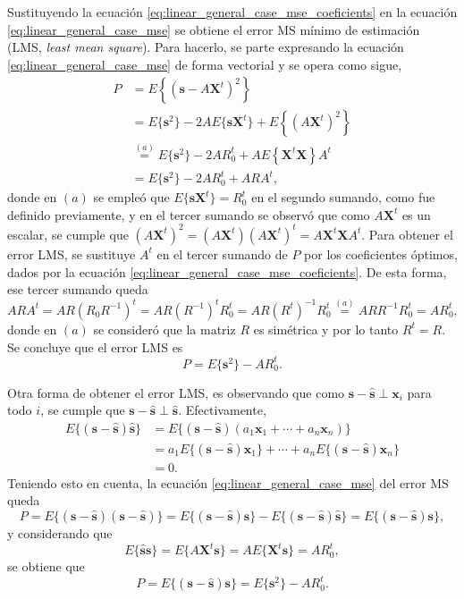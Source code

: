 \documentclass[a4paper]{report}
\newcommand{\X}{\mathbf{X}}
\newcommand{\x}{\mathbf{x}}
\newcommand{\s}{\mathbf{s}}
\begin{document}
Sustituyendo la ecuación \ref{eq:linear_general_case_mse_coeficients} en la ecuación \ref{eq:linear_general_case_mse} se obtiene el error MS mínimo de estimación (LMS, \emph{least mean square}). Para hacerlo, se parte expresando la ecuación \ref{eq:linear_general_case_mse} de forma vectorial y se opera como sigue,
\begin{align*}
 P&=E\left\{\left(\s-A\X^t\right)^2\right\}\\
  &=E\{\s^2\}-2AE\{\s\X^t\}+E\left\{\left(A\X^t\right)^2\right\}\\
  &\overset{(a)}{=}E\{\s^2\}-2AR_0^t+AE\left\{\X^t\X\right\}A^t\\
  &=E\{\s^2\}-2AR_0^t+ARA^t,
\end{align*}
donde en \((a)\) se empleó que \(E\{\s\X^t\}=R_0^t\) en el segundo sumando, como fue definido previamente, y en el tercer sumando se observó que como \(A\X^t\) es un escalar, se cumple que \((A\X^t)^2=(A\X^t)(A\X^t)^t=A\X^t\X A^t\). Para obtener el error LMS, se sustituye \(A^t\) en el tercer sumando de \(P\) por los coeficientes óptimos, dados por la ecuación \ref{eq:linear_general_case_mse_coeficients}. De esta forma, ese tercer sumando queda
\[
 ARA^t=AR(R_0R^{-1})^t=AR\left(R^{-1}\right)^tR_0^t=AR\left(R^t\right)^{-1}R_0^t
 \overset{(a)}{=}ARR^{-1}R_0^t=AR_0^t,
\]
donde en \((a)\) se consideró que la matriz \(R\) es simétrica y por lo tanto \(R^t=R\).
Se concluye que el error LMS es
\begin{equation}\label{eq:linear_general_case_mse_error}
 P=E\{\s^2\}-AR_0^t.
\end{equation}

Otra forma de obtener el error LMS, es observando que como \(\s-\hat{\s}\perp\x_i\) para todo \(i\), se cumple que \(\s-\hat{\s}\perp\hat{\s}\). Efectivamente,
\begin{align*}
 E\{(\s-\hat{\s})\hat{\s}\}&=E\{(\s-\hat{\s})(a_1\x_1+\cdots+a_n\x_n)\}\\
  &=a_1E\{(\s-\hat{\s})\x_1\}+\cdots+a_nE\{(\s-\hat{\s})\x_n\}\\
  &=0.
\end{align*}
Teniendo esto en cuenta, la ecuación \ref{eq:linear_general_case_mse} del error MS queda
\[
 P=E\{(\s-\hat{\s})(\s-\hat{\s})\}=E\{(\s-\hat{\s})\s\}-E\{(\s-\hat{\s})\hat{\s}\}=E\{(\s-\hat{\s})\s\},
\]
y considerando que
\[
 E\{\hat{\s}\s\}=E\{A\X^t\s\}=AE\{\X^t\s\}=AR_0^t,
\]
se obtiene que
\[
 P=E\{(\s-\hat{\s})\s\} = E\{\s^2\}-AR_0^t.
\]
\end{document}
